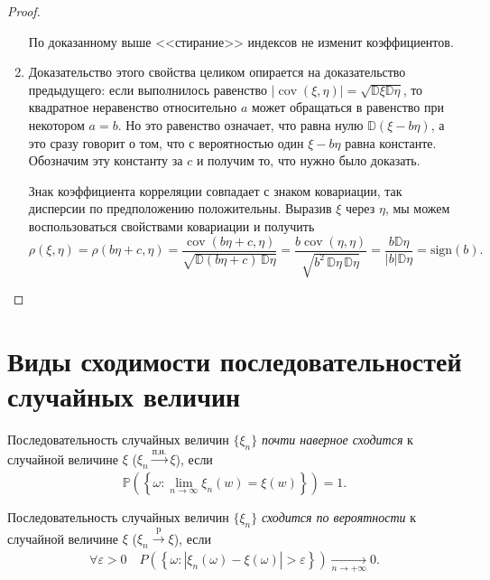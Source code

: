 \begin{proof}
\begin{enumerate}
    По доказанному выше <<стирание>> индексов не изменит коэффициентов.

    \item Доказательство этого свойства целиком опирается на доказательство предыдущего: если выполнилось равенство $|\operatorname{cov}(\xi, \eta)|=\sqrt{\mathbb{D} \xi \mathbb{D} \eta}$, то квадратное неравенство относительно $a$ может обращаться в равенство при некотором $a = b$. Но это равенство означает, что равна нулю $\mathbb{D}(\xi-b \eta)$, а это сразу говорит о том, что с вероятностью один $\xi - b\eta$ равна константе. Обозначим эту константу за $c$ и получим то, что нужно было доказать.
    
    Знак коэффициента корреляции совпадает с знаком ковариации, так дисперсии по предположению положительны. Выразив $\xi$ через $\eta$, мы можем воспользоваться свойствами ковариации и получить
    $$ \rho(\xi, \eta) = \rho(b\eta + c, \eta)=
    \frac{\operatorname{cov}(b\eta + c, \eta)}
    {\sqrt{\mathbb{D}(b\eta + c) \, \mathbb{D}\eta}} = 
    \frac{b\operatorname{cov}(\eta, \eta)}
    {\sqrt{b^2\, \mathbb{D}\eta \, \mathbb{D}\eta}} = 
    \frac{b\mathbb{D}\eta}
    {|b|\mathbb{D}\eta} = 
    \text{sign}(b).
    $$

\end{enumerate}
\end{proof}

\section{Виды сходимости последовательностей случайных величин}
\begin{defn}
    Последовательность случайных величин $\{\xi_n\}$ {\it почти наверное сходится} к случайной величине $\xi$ ($\xi_n \xrightarrow[]{\text{п.н.}} \xi$), если
    \begin{equation*}
        \mathbb{P}\left(\left\{\omega \colon \lim\limits _{n \rightarrow \infty} \xi_{n}(w)=\xi(w)\right\}\right)=1.
    \end{equation*}
\end{defn}

\begin{defn}
    Последовательность случайных величин $\{\xi_n\}$ {\it сходится по вероятности} к случайной величине $\xi$ ($\xi_n \xrightarrow[]{\text{p}} \xi$), если
    \begin{equation*}
        \forall \varepsilon>0 \quad P\left(\left\{\omega \colon |\xi_{n}(\omega)-\xi(\omega)|>\varepsilon\right\}\right) \xrightarrow[n \to +\infty]{} 0.
    \end{equation*}
\end{defn}

